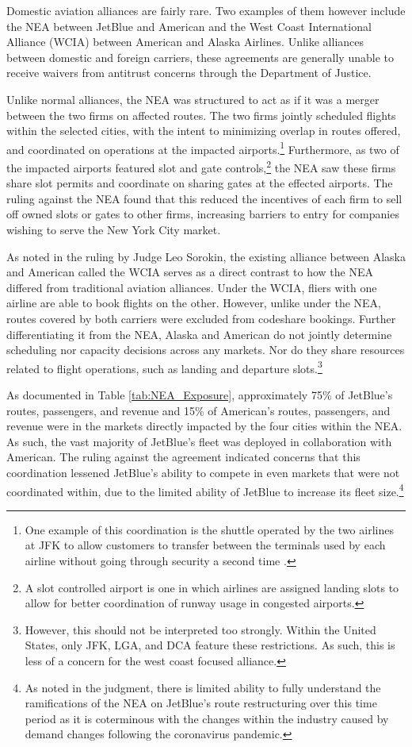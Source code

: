 \documentclass{article}
\begin{document}
	Domestic aviation alliances are fairly rare. Two examples of them however include the NEA between JetBlue and American and the West Coast International Alliance (WCIA) between American and Alaska Airlines. Unlike alliances between domestic and foreign carriers, these agreements are generally unable to receive waivers from antitrust concerns through the Department of Justice. 
	
	Unlike normal alliances, the NEA was structured to act as if it was a merger between the two firms on affected routes. The two firms jointly scheduled flights within the selected cities, with the intent to minimizing overlap in routes offered, and coordinated on operations at the impacted airports.\footnote{One example of this coordination is the shuttle operated by the two airlines at JFK to allow customers to transfer between the terminals used by each airline without going through security a second time \citep{griff_riding_2021}.} Furthermore, as two of the impacted airports featured slot and gate controls,\footnote{A slot controlled airport is one in which airlines are assigned landing slots to allow for better coordination of runway usage in congested airports.} the NEA saw these firms share slot permits and coordinate on sharing gates at the effected airports. The ruling against the NEA found that this reduced the incentives of each firm to sell off owned slots or gates to other firms, increasing barriers to entry for companies wishing to serve the New York City market.
	
	As noted in the ruling by Judge Leo Sorokin, the existing alliance between Alaska and American called the WCIA serves as a direct contrast to how the NEA differed from traditional aviation alliances. Under the WCIA, fliers with one airline are able to book flights on the other. However, unlike under the NEA, routes covered by both carriers were excluded from codeshare bookings. Further differentiating it from the NEA, Alaska and American do not jointly determine scheduling nor capacity decisions across any markets. Nor do they share resources related to flight operations, such as landing and departure slots.\footnote{However, this should not be interpreted too strongly. Within the United States, only JFK, LGA, and DCA feature these restrictions. As such, this is less of a concern for the west coast focused alliance.} 
	
	 As documented in Table \ref{tab:NEA_Exposure}, approximately 75\% of JetBlue's routes, passengers, and revenue and 15\% of American's routes, passengers, and revenue were in the markets directly impacted by the four cities within the NEA. As such, the vast majority of JetBlue's fleet was deployed in collaboration with American. The ruling against the agreement indicated concerns that this coordination lessened JetBlue's ability to compete in even markets that were not coordinated within, due to the limited ability of JetBlue to increase its fleet size.\footnote{As noted in the judgment, there is limited ability to fully understand the ramifications of the NEA on JetBlue's route restructuring over this time period as it is coterminous with the changes within the industry caused by demand changes following the coronavirus pandemic.}
	
\end{document}
